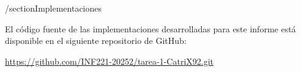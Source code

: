 /section{Implementaciones}
 
 El código fuente de las implementaciones desarrolladas para este informe está disponible en el siguiente repositorio de GitHub:

 \url{https://github.com/INF221-20252/tarea-1-CatriX92.git}